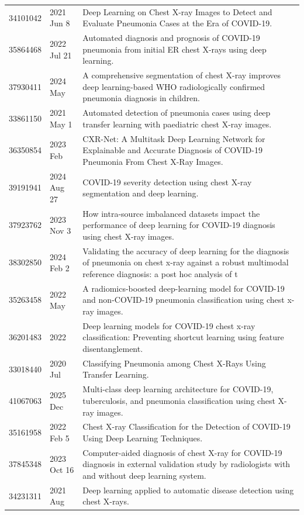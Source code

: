 \begin{longtable}{llp{9.5cm}}
34101042 & 2021 Jun 8 & Deep Learning on Chest X-ray Images to Detect and Evaluate Pneumonia Cases at the Era of COVID-19. \\
35864468 & 2022 Jul 21 & Automated diagnosis and prognosis of COVID-19 pneumonia from initial ER chest X-rays using deep learning. \\
37930411 & 2024 May & A comprehensive segmentation of chest X-ray improves deep learning-based WHO radiologically confirmed pneumonia diagnosis in children. \\
33861150 & 2021 May 1 & Automated detection of pneumonia cases using deep transfer learning with paediatric chest X-ray images. \\
36350854 & 2023 Feb & CXR-Net: A Multitask Deep Learning Network for Explainable and Accurate Diagnosis of COVID-19 Pneumonia From Chest X-Ray Images. \\
39191941 & 2024 Aug 27 & COVID-19 severity detection using chest X-ray segmentation and deep learning. \\
37923762 & 2023 Nov 3 & How intra-source imbalanced datasets impact the performance of deep learning for COVID-19 diagnosis using chest X-ray images. \\
38302850 & 2024 Feb 2 & Validating the accuracy of deep learning for the diagnosis of pneumonia on chest x-ray against a robust multimodal reference diagnosis: a post hoc analysis of t \\
35263458 & 2022 May & A radiomics-boosted deep-learning model for COVID-19 and non-COVID-19 pneumonia classification using chest x-ray images. \\
36201483 & 2022 & Deep learning models for COVID-19 chest x-ray classification: Preventing shortcut learning using feature disentanglement. \\
33018440 & 2020 Jul & Classifying Pneumonia among Chest X-Rays Using Transfer Learning. \\
41067063 & 2025 Dec & Multi-class deep learning architecture for COVID-19, tuberculosis, and pneumonia classification using chest X-ray images. \\
35161958 & 2022 Feb 5 & Chest X-ray Classification for the Detection of COVID-19 Using Deep Learning Techniques. \\
37845348 & 2023 Oct 16 & Computer-aided diagnosis of chest X-ray for COVID-19 diagnosis in external validation study by radiologists with and without deep learning system. \\
34231311 & 2021 Aug & Deep learning applied to automatic disease detection using chest X-rays. \\

\end{longtable}
